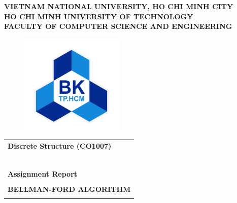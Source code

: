 \documentclass[12pt, a4paper]{article}
\begin{document}
\begin{titlepage}

    \begin{center}
        \large \textbf{VIETNAM NATIONAL UNIVERSITY, HO CHI MINH CITY} \\
        \large \textbf{HO CHI MINH UNIVERSITY OF TECHNOLOGY} \\
        \large \textbf{FACULTY OF COMPUTER SCIENCE AND ENGINEERING}
    \end{center}

    \begin{figure}[h!]
        \begin{center}
            \includegraphics[width=5cm]{Images/hcmut.png}
        \end{center}
    \end{figure}

    \begin{center}
        \begin{tabular}{c}
        \multicolumn{1}{l}{\textbf{{\Large Discrete Structure (CO1007)}}}\\
        ~~\\
        \hline
        \\
        \multicolumn{1}{l}{\textbf{{\Large Assignment Report}}}\\
        \\
        \textbf{{\Huge BELLMAN-FORD ALGORITHM}}\\
        \\
        \hline
        \end{tabular}
        \end{center}


\end{titlepage}
\end{document}
